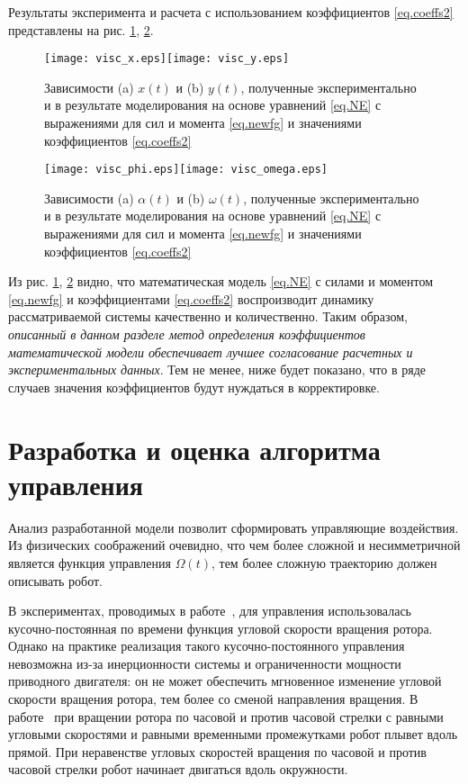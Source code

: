 Результаты эксперимента и расчета с использованием коэффициентов \eqref{eq.coeffs2} представлены на рис. \ref{fig.xy1}, \ref{fig.phiOmega1}.

\begin{figure}[h!]
	\centering
	\texttt{[image: visc\_x.eps]}\hspace{20mm}\texttt{[image: visc\_y.eps]}
	\caption{Зависимости (a) $x(t)$ и (b) $y(t)$, полученные экспериментально и в результате моделирования на основе уравнений \eqref{eq.NE} с выражениями для сил и момента \eqref{eq.newfg} и значениями коэффициентов \eqref{eq.coeffs2}}\label{fig.xy1}
\end{figure}

\begin{figure}[h!]
	\centering
	\texttt{[image: visc\_phi.eps]}\hspace{20mm}\texttt{[image: visc\_omega.eps]}
	\caption{Зависимости (a) $\alpha(t)$ и (b) $\omega(t)$, полученные экспериментально и в результате моделирования на основе уравнений \eqref{eq.NE} с выражениями для сил и момента \eqref{eq.newfg} и значениями коэффициентов \eqref{eq.coeffs2}}\label{fig.phiOmega1}
\end{figure}

Из рис. \ref{fig.xy1}, \ref{fig.phiOmega1} видно, что математическая модель \eqref{eq.NE} с силами и моментом \eqref{eq.newfg} и коэффициентами \eqref{eq.coeffs2} воспроизводит динамику рассматриваемой системы качественно и количественно. Таким образом, \textit{описанный в данном разделе метод определения коэффициентов математической модели обеспечивает лучшее согласование расчетных и экспериментальных данных}. Тем не менее, ниже будет показано, что в ряде случаев значения коэффициентов будут нуждаться в корректировке.



\section{Разработка и оценка алгоритма управления}



Анализ разработанной модели позволит сформировать управляющие воздействия. Из физических соображений очевидно, что чем более сложной и несимметричной является функция управления $\Omega(t)$, тем более сложную траекторию должен описывать робот. 

В экспериментах, проводимых в работе~\cite{Pollard_Tallapragada_2016}, для управления использовалась кусочно-постоянная по времени функция угловой скорости вращения ротора. Однако на практике реализация такого кусочно-постоянного управления невозможна из-за инерционности системы и ограниченности мощности приводного двигателя: он не может обеспечить мгновенное изменение угловой скорости вращения ротора, тем более со сменой направления вращения. В работе~\cite{Pollard_Tallapragada_2016} при вращении ротора по часовой и против часовой стрелки с равными угловыми скоростями и равными временными промежутками робот плывет вдоль прямой. При неравенстве угловых скоростей вращения по часовой и против часовой стрелки робот начинает двигаться вдоль окружности.

